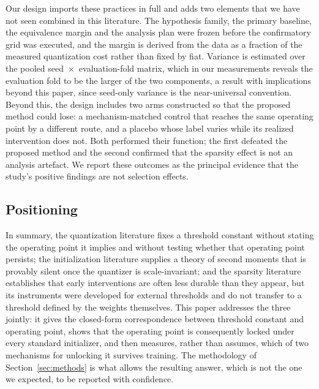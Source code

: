 \documentclass[final,5p,times,twocolumn]{elsarticle}
\theoremstyle{remark}
\begin{document}
Our design imports these practices in full and adds two elements that we have
not seen combined in this literature. The hypothesis family, the primary
baseline, the equivalence margin and the analysis plan were frozen before the
confirmatory grid was executed, and the margin is derived from the data as a
fraction of the measured quantization cost rather than fixed by fiat. Variance
is estimated over the pooled seed~$\times$~evaluation-fold matrix, which in our
measurements reveals the evaluation fold to be the larger of the two
components, a result with implications beyond this paper, since seed-only
variance is the near-universal convention. Beyond this, the design includes two
arms constructed so that the proposed method could lose: a mechanism-matched
control that reaches the same operating point by a different route, and a
placebo whose label varies while its realized intervention does not. Both
performed their function; the first defeated the proposed method and the
second confirmed that the sparsity effect is not an analysis artefact. We
report these outcomes as the principal evidence that the study's positive
findings are not selection effects.

\subsection{Positioning}
\label{sec:rel-position}

In summary, the quantization literature fixes a threshold constant without
stating the operating point it implies and without testing whether that
operating point persists; the initialization literature supplies a theory of
second moments that is provably silent once the quantizer is scale-invariant;
and the
sparsity literature establishes that early interventions are often less durable
than they appear, but its instruments were developed for external thresholds
and do not transfer to a threshold defined by the weights themselves. This
paper addresses the three jointly: it gives the closed-form correspondence
between threshold constant and operating point, shows that the operating point
is consequently locked under every standard initializer, and then measures,
rather than assumes, which of two mechanisms for unlocking it survives
training. The methodology of Section~\ref{sec:methods} is what allows the
resulting answer, which is not the one we expected, to be reported with
confidence.

\end{document}
